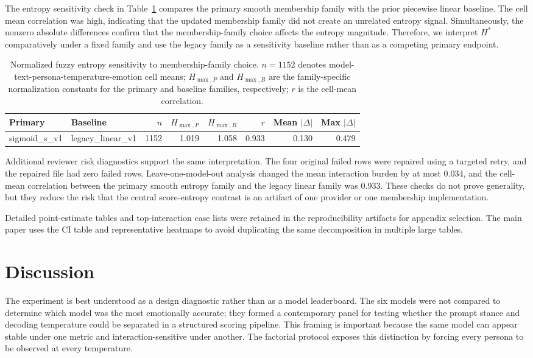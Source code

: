 \documentclass[conference]{IEEEtran}
\begin{document}
The entropy sensitivity check in Table~\ref{tab:scis-entropy-sensitivity} compares the primary smooth membership family with the prior piecewise linear baseline.
The cell mean correlation was high, indicating that the updated membership family did not create an unrelated entropy signal.
Simultaneously, the nonzero absolute differences confirm that the membership-family choice affects the entropy magnitude.
Therefore, we interpret $H^*$ comparatively under a fixed family and use the legacy family as a sensitivity baseline rather than as a competing primary endpoint.
\begin{table}[t]
\centering
\caption{Normalized fuzzy entropy sensitivity to membership-family choice. $n=1152$ denotes model-text-persona-temperature-emotion cell means; $H_{\max,P}$ and $H_{\max,B}$ are the family-specific normalization constants for the primary and baseline families, respectively; $r$ is the cell-mean correlation.}
\label{tab:scis-entropy-sensitivity}
\begin{tabular}{llrrrrrr}
\hline
Primary & Baseline & $n$ & $H_{\max,P}$ & $H_{\max,B}$ & $r$ & Mean $|\Delta|$ & Max $|\Delta|$ \\
\hline
sigmoid\_s\_v1 & legacy\_linear\_v1 & 1152 & 1.019 & 1.058 & 0.933 & 0.130 & 0.479 \\
\hline
\end{tabular}
\end{table}

Additional reviewer risk diagnostics support the same interpretation.
The four original failed rows were repaired using a targeted retry, and the repaired file had zero failed rows.
Leave-one-model-out analysis changed the mean interaction burden by at most 0.034, and the cell-mean correlation between the primary smooth entropy family and the legacy linear family was 0.933.
These checks do not prove generality, but they reduce the risk that the central score-entropy contrast is an artifact of one provider or one membership implementation.

Detailed point-estimate tables and top-interaction case lists were retained in the reproducibility artifacts for appendix selection.
The main paper uses the CI table and representative heatmaps to avoid duplicating the same decomposition in multiple large tables.

\section{Discussion}
The experiment is best understood as a design diagnostic rather than as a model leaderboard.
The six models were not compared to determine which model was the most emotionally accurate; they formed a contemporary panel for testing whether the prompt stance and decoding temperature could be separated in a structured scoring pipeline.
This framing is important because the same model can appear stable under one metric and interaction-sensitive under another.
The factorial protocol exposes this distinction by forcing every persona to be observed at every temperature.
\end{document}
